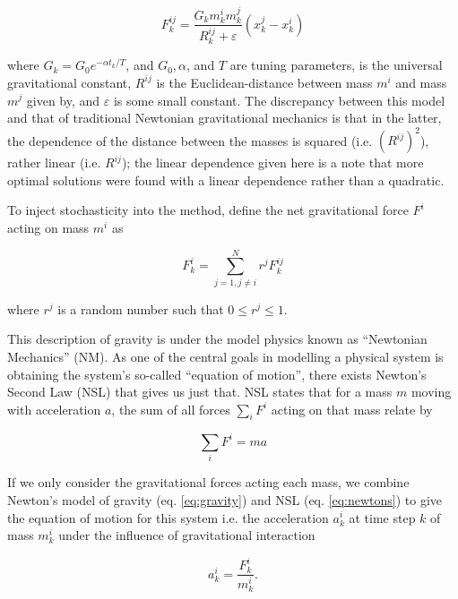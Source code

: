\documentclass{article}
\begin{document}
            \begin{equation}
                F_k^{ij} = \frac{G_k m_k^i m_k^j}{R_k^{ij} + \varepsilon} \left(x_k^j - x_k^i \right)
            \end{equation}

            where $G_k = G_0 e^{-\alpha t_k /T}$, and $G_0, \alpha$, and $T$ are tuning parameters, is the universal gravitational constant, $R^{ij}$ is the Euclidean-distance between mass $m^i$ and mass $m^j$ given by, and $\varepsilon$ is some small constant.  The discrepancy between this model and that of traditional Newtonian gravitational mechanics is that in the latter, the dependence of the distance between the masses is squared (i.e. $\left(R^{ij}\right)^2$), rather linear (i.e. $R^{ij}$); the linear dependence given here is a note that more optimal solutions were found\cite{GSA} with a linear dependence rather than a quadratic.

            To inject stochasticity into the method, define the net gravitational force $F^i$ acting on mass $m^i$ as 

            \begin{equation}\label{eq:gravity}
                F_k^i = \sum_{j = 1, j \neq i}^{N} r^j F_k^{ij}
            \end{equation}

            where $r^j$ is a random number such that $0 \leq r^j \leq 1$.

            This description of gravity is under the model physics known as ``Newtonian Mechanics'' (NM).  As one of the central goals in modelling a physical system is obtaining the system's so-called ``equation of motion'', there exists Newton's Second Law (NSL) that gives us just that.  NSL states that for a mass $m$ moving with acceleration $a$, the sum of all forces $\sum_i F^i$ acting on that mass relate by

            \begin{equation}\label{eq:newtons}
                \sum_i F^i = m a
            \end{equation}

            If we only consider the gravitational forces acting each mass, we combine Newton's model of gravity (eq. \ref{eq:gravity}) and NSL (eq. \ref{eq:newtons}) to give the equation of motion for this system i.e. the acceleration $a_k^i$ at time step $k$ of mass $m_k^i$ under the influence of gravitational interaction

            \begin{equation}\label{eq:eom}
                a_k^i = \frac{F_k^i}{m_k^i}.
            \end{equation}
\end{document}
